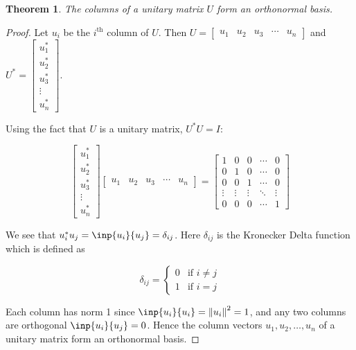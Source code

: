 \documentclass[twofold]{article}
\newcommand*\adj[1]{#1^*}
\newcommand*\norm[1]{\left \Vert #1 \right\Vert}
\theoremstyle{plain}
\newtheorem{theorem}{Theorem}
\theoremstyle{definition}
\theoremstyle{remark}
\begin{document}
\begin{theorem} The columns of a unitary matrix \(U\) form an orthonormal basis. \end{theorem}
\begin{proof}  Let \(u_i\) be the \(i^\text{th}\) column of \(U\). Then \(U = \begin{bmatrix} u_1 & u_2 & u_3 & \cdots & u_n \end{bmatrix}\) and \(\adj{U} = \begin{bmatrix} \adj{u_1} \\ \adj{u_2} \\ \adj{u_3} \\ \vdots \\ \adj{u_n} \end{bmatrix} \). 

Using the fact that \(U\) is a unitary matrix, \(\adj{U} U = I\):

\[  \begin{bmatrix} \adj{u_1} \\ \adj{u_2} \\ \adj{u_3} \\ \vdots \\ \adj{u_n} \end{bmatrix} \begin{bmatrix} u_1 & u_2 & u_3 & \cdots & u_n \end{bmatrix} = \begin{bmatrix} 1 & 0 & 0 & \cdots & 0 \\
0 & 1 & 0 & \cdots & 0 \\
0 & 0 & 1 & \cdots & 0 \\
\vdots & \vdots & \vdots & \ddots & \vdots \\
0 & 0 & 0 & \cdots & 1\end{bmatrix}\]

We see that \(\adj{u_i} u_j = \inp{u_i}{u_j} = \delta_{ij}\). Here \(\delta_{ij}\) is the Kronecker Delta function which is defined as

\[\delta_{ij} = \begin{cases} 
0 & \text{if } i \ne j \\
1 & \text{if } i = j \end{cases}
 \]


Each column has norm 1 since \(\inp{u_i}{u_i}= \norm{u_i}^2  =1\), and any two columns are orthogonal \(\inp{u_i}{u_j} = 0\). Hence the column vectors \(u_1, u_2, \ldots , u_n\) of a unitary matrix form an orthonormal basis.
    \end{proof}
\end{document}
